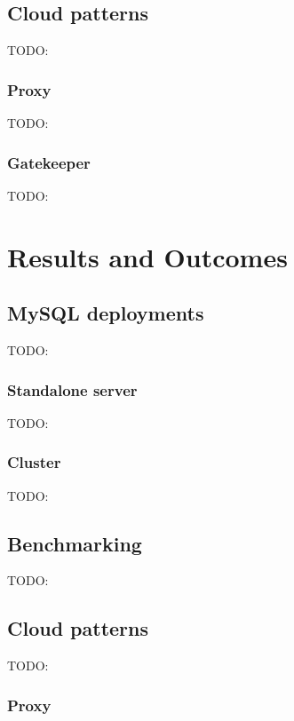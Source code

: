 \documentclass[letterpaper,headings=standardclasses,parskip=half]{scrartcl}
\begin{document}
\subsection{Cloud patterns}

TODO:

\subsubsection{Proxy}

TODO:

\subsubsection{Gatekeeper}

TODO:

\section{Results and Outcomes}

\subsection{MySQL deployments}

TODO:

\subsubsection{Standalone server}

TODO:

\subsubsection{Cluster}

TODO:

\subsection{Benchmarking}

TODO:

\subsection{Cloud patterns}

TODO:

\subsubsection{Proxy}
\end{document}
